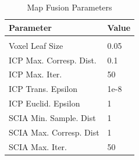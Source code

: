 \documentclass[letterpaper, oneside, 10pt]{report}
\begin{document}
\begin{table}[h!]
  \centering
  \caption{Map Fusion Parameters}
  \vspace{2mm}
  \begin{tabular}{l l}
    \hline \hline
    \vspace{-2mm}
    Parameter & \multicolumn{1}{l}{Value} \\ [1ex]
    \hline
    & \\
    Voxel Leaf Size & 0.05 \\
    ICP Max. Corresp. Dist. & 0.1 \\
    ICP Max. Iter. & 50 \\
    ICP Trans. Epsilon & 1e-8 \\
    ICP Euclid. Epsilon & 1 \\
    SCIA Min. Sample. Dist & 1 \\
    SCIA Max. Corresp. Dist & 1 \\
    SCIA Max. Iter. & 50 \\
  \end{tabular}
  \label{tbl: map fusion param.}
\end{table}

\clearpage



\end{document}
